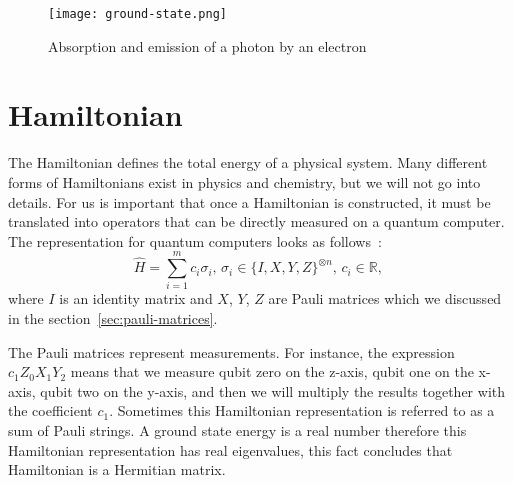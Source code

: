 
\begin{figure}[H]
    \centering
    \texttt{[image: ground-state.png]}
    \caption{Absorption and emission of a photon by an electron~\cite{img:ground-state}}
\end{figure}

\section{Hamiltonian}
The Hamiltonian defines the total energy of a physical system. Many different forms of Hamiltonians exist in physics and chemistry, but we will not go into details. For us is important that once a Hamiltonian is constructed, it must be translated into operators that can be directly measured on a quantum computer. The representation for quantum computers looks as follows~\cite{vqe_method}:
\begin{equation*}
\hat{H} = \sum_{i=1}^{m}c_i\sigma_i \text{, } \sigma_i \in \{I, X, Y, Z\}^{\otimes n}\text{, } c_i \in \mathbb{R} \text{, }
\end{equation*}
where $I$ is an identity matrix and $X$, $Y$, $Z$ are Pauli matrices which we discussed in the section~\ref{sec:pauli-matrices}.

The Pauli matrices represent measurements. For instance, the expression $c_{1}Z_{0}X_{1}Y_{2}$ means that we measure qubit zero on the z-axis, qubit one on the x-axis, qubit two on the y-axis, and then we will multiply the results together with the coefficient $c_{1}$. Sometimes this Hamiltonian representation is referred to as a sum of Pauli strings. A ground state energy is a real number therefore this Hamiltonian representation has real eigenvalues, this fact concludes that Hamiltonian is a Hermitian matrix.